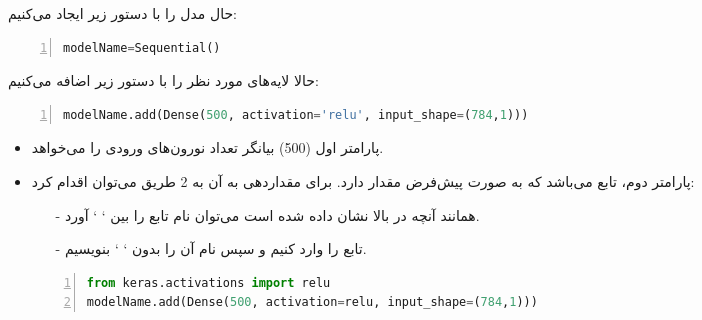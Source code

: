 \documentclass[10pt,xcolor=dvipsnames,professionalfont]{beamer}
\begin{document}
\begin{frame}[fragile]
حال مدل را با دستور زیر ایجاد می‌کنیم:
\begin{latin}
\begin{lstlisting}[language=Python,frame=single,rulecolor=\color{magenta},numbers=left,numberstyle=\tiny]
modelName=Sequential()
\end{lstlisting}
\end{latin}
حالا لایه‌های مورد نظر را با دستور زیر اضافه می‌کنیم:
\begin{latin}
\begin{lstlisting}[language=Python,frame=single,rulecolor=\color{magenta},numbers=left,numberstyle=\tiny]
modelName.add(Dense(500, activation='relu', input_shape=(784,1)))
\end{lstlisting}
\end{latin}

\begin{itemize}
\item
پارامتر اول (500) بیانگر تعداد نورون‌های ورودی را می‌خواهد.
\vspace{0.5cm}

\item
پارامتر دوم، تابع  می‌باشد که به صورت پیش‌فرض مقدار  دارد. برای مقداردهی به آن به 2 طریق می‌توان اقدام کرد:
\begin{center}
\begin{itemize}
\item[-]
همانند آنچه در بالا نشان داده شده است می‌توان نام تابع  را بین ` ` آورد.
\item[-]
تابع  را وارد کنیم و سپس نام آن را بدون ` ` بنویسیم.
\end{itemize}
\end{center}

\begin{latin}
\begin{lstlisting}[language=Python,frame=single,rulecolor=\color{magenta},numbers=left,numberstyle=\tiny]
from keras.activations import relu
modelName.add(Dense(500, activation=relu, input_shape=(784,1)))
\end{lstlisting}
\end{latin}

\end{itemize}

\end{frame}
\end{document}
